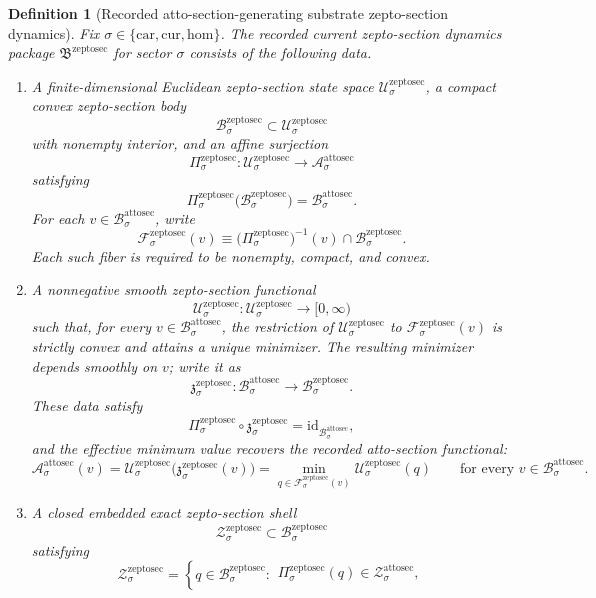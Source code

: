 \documentclass[11pt]{article}
\newcommand{\Car}{\mathrm{car}}
\newcommand{\Cur}{\mathrm{cur}}
\newcommand{\Hom}{\mathrm{hom}}
\newcommand{\AttoSectionSpace}[1]{\mathcal A_{#1}^{\mathrm{attosec}}}
\newcommand{\AttoSectionBody}[1]{\mathcal B_{#1}^{\mathrm{attosec}}}
\newcommand{\AttoSectionFunctional}[1]{\mathscr A_{#1}^{\mathrm{attosec}}}
\newcommand{\AttoSectionShell}[1]{\mathcal Z_{#1}^{\mathrm{attosec}}}
\newcommand{\ZeptoSectionPackage}{\mathfrak B^{\mathrm{zeptosec}}}
\newcommand{\ZeptoSectionSpace}[1]{\mathcal U_{#1}^{\mathrm{zeptosec}}}
\newcommand{\ZeptoSectionBody}[1]{\mathcal B_{#1}^{\mathrm{zeptosec}}}
\newcommand{\ZeptoSectionProj}[1]{\Pi_{#1}^{\mathrm{zeptosec}}}
\newcommand{\ZeptoSectionFiber}[2]{\mathcal F_{#1}^{\mathrm{zeptosec}}(#2)}
\newcommand{\ZeptoSectionAttoMin}[1]{\mathfrak z_{#1}^{\mathrm{zeptosec}}}
\newcommand{\ZeptoSectionFunctional}[1]{\mathscr U_{#1}^{\mathrm{zeptosec}}}
\newcommand{\ZeptoSectionShell}[1]{\mathcal Z_{#1}^{\mathrm{zeptosec}}}
\newtheorem{definition}{Definition}
\begin{document}
\begin{definition}[Recorded atto-section-generating substrate zepto-section dynamics]
\label{def:zeptosec}
Fix \(\sigma\in\{\Car,\Cur,\Hom\}\). The recorded current zepto-section dynamics package \(\ZeptoSectionPackage\) for sector \(\sigma\) consists of the following data.
\begin{enumerate}
    \item A finite-dimensional Euclidean zepto-section state space \(\ZeptoSectionSpace{\sigma}\), a compact convex zepto-section body
    \[
    \ZeptoSectionBody{\sigma}\subset\ZeptoSectionSpace{\sigma}
    \]
    with nonempty interior, and an affine surjection
    \[
    \ZeptoSectionProj{\sigma}:\ZeptoSectionSpace{\sigma}\to\AttoSectionSpace{\sigma}
    \]
    satisfying
    \[
    \ZeptoSectionProj{\sigma}\bigl(\ZeptoSectionBody{\sigma}\bigr)=\AttoSectionBody{\sigma}.
    \]
    For each \(v\in\AttoSectionBody{\sigma}\), write
    \[
    \ZeptoSectionFiber{\sigma}{v}
    \equiv
    \bigl(\ZeptoSectionProj{\sigma}\bigr)^{-1}(v)\cap\ZeptoSectionBody{\sigma}.
    \]
    Each such fiber is required to be nonempty, compact, and convex.
    \item A nonnegative smooth zepto-section functional
    \[
    \ZeptoSectionFunctional{\sigma}:\ZeptoSectionSpace{\sigma}\to[0,\infty)
    \]
    such that, for every \(v\in\AttoSectionBody{\sigma}\), the restriction of \(\ZeptoSectionFunctional{\sigma}\) to \(\ZeptoSectionFiber{\sigma}{v}\) is strictly convex and attains a unique minimizer. The resulting minimizer depends smoothly on \(v\); write it as
    \[
    \ZeptoSectionAttoMin{\sigma}:\AttoSectionBody{\sigma}\to\ZeptoSectionBody{\sigma}.
    \]
    These data satisfy
    \[
    \ZeptoSectionProj{\sigma}\circ\ZeptoSectionAttoMin{\sigma}
    =
    \mathrm{id}_{\AttoSectionBody{\sigma}},
    \]
    and the effective minimum value recovers the recorded atto-section functional:
    \[
    \AttoSectionFunctional{\sigma}(v)
    =
    \ZeptoSectionFunctional{\sigma}\bigl(\ZeptoSectionAttoMin{\sigma}(v)\bigr)
    =
    \min_{q\in\ZeptoSectionFiber{\sigma}{v}}
    \ZeptoSectionFunctional{\sigma}(q)
    \qquad
    \text{for every }
    v\in\AttoSectionBody{\sigma}.
    \]
    \item A closed embedded exact zepto-section shell
    \[
    \ZeptoSectionShell{\sigma}\subset\ZeptoSectionBody{\sigma}
    \]
    satisfying
    \[
    \ZeptoSectionShell{\sigma}
    =
    \left\{
    q\in\ZeptoSectionBody{\sigma}:
    \begin{array}{l}
    \ZeptoSectionProj{\sigma}(q)\in\AttoSectionShell{\sigma},\\[0.2em]

\end{array}\]
\end{enumerate}
\end{definition}
\end{document}
